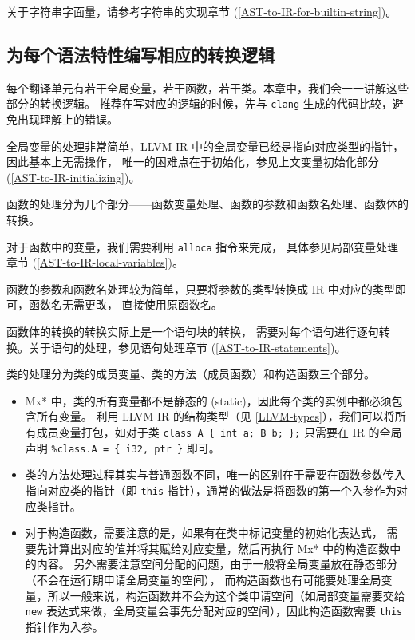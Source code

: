 关于字符串字面量，请参考字符串的实现章节 (\ref{AST-to-IR-for-builtin-string})。

\subsection{为每个语法特性编写相应的转换逻辑}\label{AST-to-IR-specific-grammar}

每个翻译单元有若干全局变量，若干函数，若干类。本章中，我们会一一讲解这些部分的转换逻辑。
推荐在写对应的逻辑的时候，先与 \texttt{clang} 生成的代码比较，避免出现理解上的错误。

全局变量的处理非常简单，LLVM IR 中的全局变量已经是指向对应类型的指针，因此基本上无需操作，
唯一的困难点在于初始化，参见上文变量初始化部分 (\ref{AST-to-IR-initializing})。

函数的处理分为几个部分——函数变量处理、函数的参数和函数名处理、函数体的转换。

对于函数中的变量，我们需要利用 \texttt{alloca} 指令来完成，
具体参见局部变量处理章节 (\ref{AST-to-IR-local-variables})。

函数的参数和函数名处理较为简单，只要将参数的类型转换成 IR 中对应的类型即可，函数名无需更改，
直接使用原函数名。

函数体的转换的转换实际上是一个语句块的转换，
需要对每个语句进行逐句转换。关于语句的处理，参见语句处理章节 (\ref{AST-to-IR-statements})。

类的处理分为类的成员变量、类的方法（成员函数）和构造函数三个部分。
\begin{itemize}
  \item Mx* 中，类的所有变量都不是静态的 (static)，因此每个类的实例中都必须包含所有变量。
    利用 LLVM IR 的结构类型（见 \ref{LLVM-types}），我们可以将所有成员变量打包，如对于类
    \texttt{class A \{ int a; B b; \};} 只需要在 IR 的全局声明
    \texttt{\%class.A = \{ i32, ptr \}} 即可。
  \item 类的方法处理过程其实与普通函数不同，唯一的区别在于需要在函数参数传入指向对应类的指针（即
    \texttt{this} 指针），通常的做法是将函数的第一个入参作为对应类指针。
  \item 对于构造函数，需要注意的是，如果有在类中标记变量的初始化表达式，
    需要先计算出对应的值并将其赋给对应变量，然后再执行 Mx* 中的构造函数中的内容。
    另外需要注意空间分配的问题，由于一般将全局变量放在静态部分（不会在运行期申请全局变量的空间），
    而构造函数也有可能要处理全局变量，所以一般来说，构造函数并不会为这个类申请空间（如局部变量需要交给
    \texttt{new} 表达式来做，全局变量会事先分配对应的空间），因此构造函数需要
    \texttt{this} 指针作为入参。
\end{itemize}


